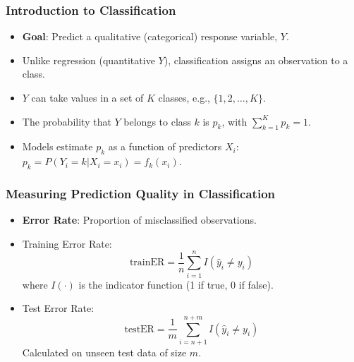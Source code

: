 \documentclass[12pt,a4paper]{article}
\begin{document}
\begin{itemize}
    \subsubsection{Introduction to Classification }
        \begin{itemize}
            \item \textbf{Goal}: Predict a qualitative (categorical) response variable, $Y$.
            \item Unlike regression (quantitative $Y$), classification assigns an observation to a class.
            \item $Y$ can take values in a set of $K$ classes, e.g., $\{1, 2, \dots, K\}$.
            \item The probability that $Y$ belongs to class $k$ is $p_k$, with $\sum_{k=1}^{K} p_k = 1$.
            \item Models estimate $p_k$ as a function of predictors $X_i$: $p_k = P(Y_i=k | X_i=x_i) = f_k(x_i)$.
        \end{itemize}

    \subsubsection{Measuring Prediction Quality in Classification }
        \begin{itemize}
            \item \textbf{Error Rate}: Proportion of misclassified observations.
            \item Training Error Rate:
                $$ \text{trainER} = \frac{1}{n} \sum_{i=1}^{n} I(\hat{y}_i \neq y_i) $$
                where $I(\cdot)$ is the indicator function (1 if true, 0 if false).
            \item Test Error Rate:
                $$ \text{testER} = \frac{1}{m} \sum_{i=n+1}^{n+m} I(\hat{y}_i \neq y_i) $$
                Calculated on unseen test data of size $m$.
        \end{itemize}


\end{itemize}
\end{document}
